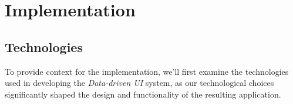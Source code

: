 \chapter{Implementation}
\label{chap:implementation}


\section{Technologies}
\label{sec:technologies}
To provide context for the implementation, we'll first examine the technologies used in developing the \emph{Data-driven UI} system, as our technological choices significantly shaped the design and functionality of the resulting application.

